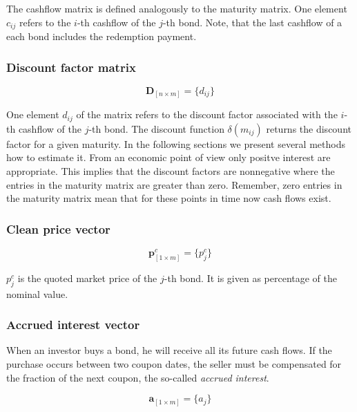 The cashflow matrix is defined analogously to the maturity matrix. One element $c_{ij}$ refers to the $i$-th cashflow of the $j$-th bond. Note, that the last cashflow of a each bond includes the redemption payment.

\subsubsection*{Discount factor matrix}

 \begin{equation*}\label{discountm}
\bm{D}_{\left[n\times m\right]}= \{d_{ij}\}
\end{equation*}

One element $d_{ij}$ of the matrix refers to the discount factor associated with the $i$-th cashflow of the $j$-th bond. The discount function $\delta(m_{ij})$ returns the discount factor for a given maturity. In the following sections we present several methods how to estimate it. From an economic point of view only positve interest are appropriate. This implies that the discount factors are nonnegative where the entries in the maturity matrix are greater than zero. Remember, zero entries in the maturity matrix mean that for these points in time now cash flows exist.

\subsubsection*{Clean price vector}

 \begin{equation*}\label{pc}
\bm{p}^c_{\left[1\times m\right]}= \{p^c_j\}
\end{equation*}

$p_{j}^c$ is the quoted market price of the $j$-th bond. It is given as percentage of the nominal value.

\subsubsection*{Accrued interest vector}

When an investor buys a bond, he will receive all its future cash flows. If the purchase occurs between two coupon dates, the seller must be compensated for the fraction of the next coupon, the so-called \emph{accrued interest}.

  \begin{equation*}\label{a}
\bm{a}_{\left[1\times m\right]}= \{a_j\}
\end{equation*}


